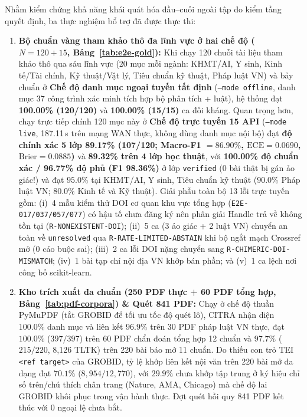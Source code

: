 Nhằm kiểm chứng khả năng khái quát hóa đầu--cuối ngoài tập đo kiểm tầng quyết định, ba thực nghiệm bổ trợ đã được thực thi:
\begin{enumerate}
    \item \textbf{Bộ chuẩn vàng tham khảo thô đa lĩnh vực ở hai chế độ ($N = 120 + 15$, Bảng~\ref{tab:e2e-gold}):} Khi chạy 120 chuỗi tài liệu tham khảo thô qua sáu lĩnh vực (20 mục mỗi ngành: KHMT/AI, Y sinh, Kinh tế/Tài chính, Kỹ thuật/Vật lý, Tiêu chuẩn kỹ thuật, Pháp luật VN) và bảy chuẩn ở \textbf{Chế độ danh mục ngoại tuyến tất định} (\texttt{--mode offline}, danh mục 37 công trình xác minh tích hợp bộ phân tích + luật), hệ thống đạt \textbf{100.00\% (120/120)} và \textbf{100.00\% (15/15)} ca đối kháng. Quan trọng hơn, chạy trực tiếp chính 120 mục này ở \textbf{Chế độ trực tuyến 15 API} (\texttt{--mode live}, 187.11\,s trên mạng WAN thực, không dùng danh mục nội bộ) đạt \textbf{độ chính xác 5 lớp 89.17\% (107/120; Macro-F1 $= 86.90\%$, $\text{ECE} = 0.0690$, $\text{Brier} = 0.0885$)} và \textbf{89.32\% trên 4 lớp học thuật}, với \textbf{100.00\% độ chuẩn xác / 96.77\% độ phủ (F1 98.36\%)} ở lớp \texttt{verified} (0 bài thật bị gán ảo giác!) và đạt $95.0\%$ tại KHMT/AI, Y sinh, Tiêu chuẩn kỹ thuật ($90.0\%$ Pháp luật VN; $80.0\%$ Kinh tế và Kỹ thuật). Giải phẫu toàn bộ 13 lỗi trực tuyến gồm: (i)~4 mẫu kiểm thử DOI cơ quan khu vực tổng hợp (\texttt{E2E-017/037/057/077}) có hậu tố chưa đăng ký nên phân giải Handle trả về không tồn tại (\texttt{R-NONEXISTENT-DOI}); (ii)~5 ca (3 ảo giác + 2 luật VN) chuyển an toàn về \texttt{unresolved} qua \texttt{R-RATE-LIMITED-ABSTAIN} khi bộ ngắt mạch Crossref mở (0 cáo buộc sai); (iii)~2 ca lỗi DOI nặng chuyển sang \texttt{R-CHIMERIC-DOI-MISMATCH}; (iv)~1 bài tạp chí nội địa VN khớp bán phần; và (v)~1 ca lệch nơi công bố scikit-learn.
    \item \textbf{Kho trích xuất đa chuẩn (250 PDF thực + 60 PDF tổng hợp, Bảng~\ref{tab:pdf-corpora}) \& Quét 841 PDF:} Chạy ở chế độ thuần PyMuPDF (tắt GROBID để tối ưu tốc độ quét lô), CITRA nhận diện $100.0\%$ danh mục và liên kết $96.9\%$ trên 30 PDF pháp luật VN thực, đạt $100.0\%$ ($397/397$) trên 60 PDF chẩn đoán tổng hợp 12 chuẩn và $97.7\%$ ($215/220$, 8,126 TLTK) trên 220 bài báo mở 11 chuẩn. Do thiếu con trỏ TEI \texttt{<ref target>} của GROBID, tỷ lệ khớp liên kết nội văn trên 220 bài mở đa dạng đạt $70.1\%$ ($8{,}954/12{,}770$), với $29.9\%$ chưa khớp tập trung ở ký hiệu chỉ số trên/chú thích chân trang (Nature, AMA, Chicago) mà chế độ lai GROBID khôi phục trong vận hành thực. Đợt quét hồi quy 841 PDF kết thúc với $0$ ngoại lệ chưa bắt.

\end{enumerate}

